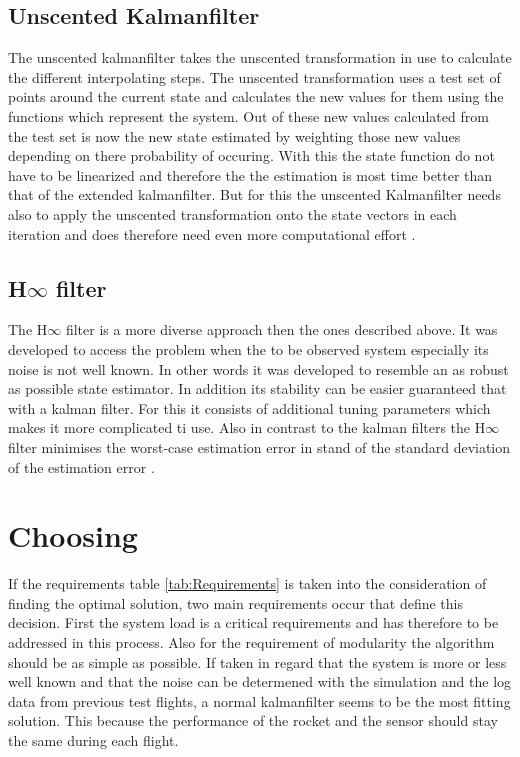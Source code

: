   \subsection{Unscented Kalmanfilter}
  The unscented kalmanfilter takes the unscented transformation in use to calculate the different interpolating steps.
  The unscented transformation uses a test set of points around the current state and calculates the new values for them using the functions which represent the system.
  Out of these new values calculated from the test set is now the new state estimated by weighting those new values depending on there probability of occuring. 
  With this the state function do not have to be linearized and therefore the the estimation is most time better than that of the extended kalmanfilter.
  But for this the unscented Kalmanfilter needs also to apply the unscented transformation onto the state vectors in each iteration
  and does therefore need even more computational effort \cite{SimonDan2006Ose:}.
  
  \subsection{H$\infty$ filter}
  The H$\infty$ filter is a more diverse approach then the ones described above.
  It was developed to access the problem when the to be observed system especially its noise is not well known.
  In other words it was developed to resemble an as robust as possible state estimator.
  In addition its stability can be easier guaranteed that with a kalman filter.
  For this it consists of additional tuning parameters which makes it more complicated ti use.
  Also in contrast to the kalman filters the H$\infty$ filter minimises the worst-case estimation error 
  in stand of the standard deviation of the estimation error \cite{SimonDan2006Ose:}.
  
  \section{Choosing}
  If the requirements table \ref{tab:Requirements} is taken into the consideration of finding
  the optimal solution, two main requirements occur that define this decision.
  First the system load is a critical requirements and has therefore to be addressed in this process.
  Also for the requirement of modularity the algorithm should be as simple as possible.
  If taken in regard that the system is more or less well known and that the noise can be
  determened with the simulation and the log data from previous test flights,
  a normal kalmanfilter seems to be the most fitting solution.
  This because the performance of the rocket and the sensor should stay the same during
  each flight. 
  
